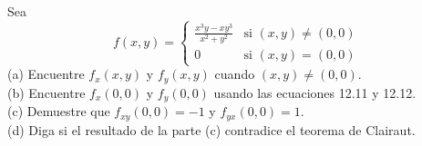\item Sea
\[ f(x,y) = \begin{cases} 
  \frac{x^3y - xy^3}{x^2+y^2} & \text{si } (x,y) \neq (0,0) \\ 
  0 & \text{si } (x,y) = (0,0) 
\end{cases} \]
(a) Encuentre $f_x(x, y)$ y $f_y(x, y)$ cuando $(x,y) \neq (0,0)$. \\
(b) Encuentre $f_x(0, 0)$ y $f_y(0, 0)$ usando las ecuaciones 12.11 y 12.12. \\
(c) Demuestre que $f_{xy}(0, 0) = -1$ y $f_{yx}(0, 0) = 1$. \\
(d) Diga si el resultado de la parte (c) contradice el teorema de Clairaut.
